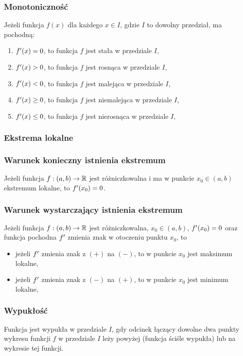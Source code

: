 \documentclass[../Matematyka.tex]{subfiles}
\begin{document}
    \subsubsection{Monotoniczność}
    Jeżeli funkcja \(f(x)\) dla każdego \(x \in I\), gdzie \(I\) to dowolny przedział, ma pochodną:
    \begin{enumerate}
        \item \(f^\prime(x) = 0\), to funkcja \(f\) jest stała w przedziale \(I\),
        \item \(f^\prime(x) > 0\), to funkcja \(f\) jest rosnąca w przedziale \(I\),
        \item \(f^\prime(x) < 0\), to funkcja \(f\) jest malejąca w przedziale \(I\),
        \item \(f^\prime(x) \geq 0\), to funkcja \(f\) jest niemalejąca w przedziale \(I\),
        \item \(f^\prime(x) \leq 0\), to funkcja \(f\) jest nierosnąca w przedziale \(I\),
    \end{enumerate}

    \subsubsection{Ekstrema lokalne}
    \subsubsection*{Warunek konieczny istnienia ekstremum}
    Jeżeli funkcja \(f:(a, b) \rightarrow \mathbb{R}\) jest różniczkowalna i ma w punkcie \(x_0 \in (a,b)\) ekstremum lokalne, to \(f^\prime(x_0) = 0\).

    \subsubsection*{Warunek wystarczający istnienia ekstremum}
    Jeżeli funkcja \(f:(a, b) \rightarrow \mathbb{R}\) jest różniczkowalna, \(x_0 \in (a,b)\), \(f^\prime(x_0) = 0\) oraz funkcja pochodna \(f^\prime\) zmienia znak w otoczeniu punktu \(x_0\), to
    \begin{itemize}
        \item jeżeli \(f^\prime\) zmienia znak z \((+)\) na \((-)\), to w punkcie \(x_0\) jest maksimum lokalne,
        \item jeżeli \(f^\prime\) zmienia znak z \((-)\) na \((+)\), to w punkcie \(x_0\) jest minimum lokalne,
    \end{itemize}

    \newpage
    \subsubsection{Wypukłość}
    Funkcja jest wypukła w przedziale \(I\), gdy odcinek łączący dowolne dwa punkty wykresu funkcji \(f\) w przedziale \(I\) leży powyżej (funkcja ściśle wypukła) lub na wykresie tej funkcji.
\end{document}
